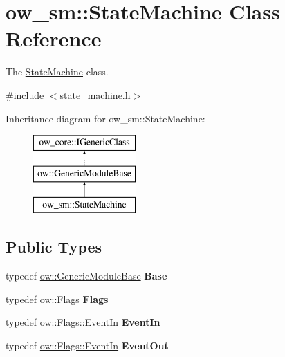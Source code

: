 \hypertarget{classow__sm_1_1StateMachine}{}\section{ow\+\_\+sm\+:\+:State\+Machine Class Reference}
\label{classow__sm_1_1StateMachine}


The \hyperlink{classow__sm_1_1StateMachine}{State\+Machine} class.  




{\ttfamily \#include $<$state\+\_\+machine.\+h$>$}

Inheritance diagram for ow\+\_\+sm\+:\+:State\+Machine\+:\begin{figure}[H]
\begin{center}
\leavevmode
\includegraphics[height=3.000000cm]{db/d75/classow__sm_1_1StateMachine}
\end{center}
\end{figure}
\subsection*{Public Types}
\begin{DoxyCompactItemize}
\item 
typedef \hyperlink{classow_1_1GenericModuleBase}{ow\+::\+Generic\+Module\+Base} {\bfseries Base}\hypertarget{classow__sm_1_1StateMachine_afbeeb17d101f845ed20e301bed356dff}{}\label{classow__sm_1_1StateMachine_afbeeb17d101f845ed20e301bed356dff}

\item 
typedef \hyperlink{classow__core_1_1Flags}{ow\+::\+Flags} {\bfseries Flags}\hypertarget{classow__sm_1_1StateMachine_a6632a0818053052153eac86ea73bdd73}{}\label{classow__sm_1_1StateMachine_a6632a0818053052153eac86ea73bdd73}

\item 
typedef \hyperlink{classow__core_1_1Flags_a97da2cfc7e3e4b51aac33116f914bd2b}{ow\+::\+Flags\+::\+Event\+In} {\bfseries Event\+In}\hypertarget{classow__sm_1_1StateMachine_a395304bddccab6b47dac39d4cab02e50}{}\label{classow__sm_1_1StateMachine_a395304bddccab6b47dac39d4cab02e50}

\item 
typedef \hyperlink{classow__core_1_1Flags_a97da2cfc7e3e4b51aac33116f914bd2b}{ow\+::\+Flags\+::\+Event\+In} {\bfseries Event\+Out}\hypertarget{classow__sm_1_1StateMachine_abfe32db2dad751bea3b70118d1e84e80}{}\label{classow__sm_1_1StateMachine_abfe32db2dad751bea3b70118d1e84e80}

\end{DoxyCompactItemize}
